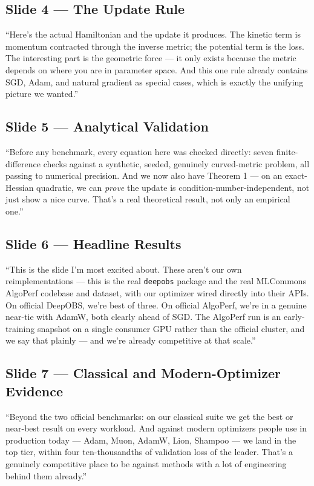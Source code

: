 \documentclass[11pt]{article}
\begin{document}
\subsection*{Slide 4 --- The Update Rule}
``Here's the actual Hamiltonian and the update it produces. The kinetic term is momentum
contracted through the inverse metric; the potential term is the loss. The interesting part is
the geometric force --- it only exists because the metric depends on where you are in parameter
space. And this one rule already contains SGD, Adam, and natural gradient as special cases, which
is exactly the unifying picture we wanted.''

\subsection*{Slide 5 --- Analytical Validation}
``Before any benchmark, every equation here was checked directly: seven finite-difference checks
against a synthetic, seeded, genuinely curved-metric problem, all passing to numerical precision.
And we now also have Theorem 1 --- on an exact-Hessian quadratic, we can \emph{prove} the update
is condition-number-independent, not just show a nice curve. That's a real theoretical result,
not only an empirical one.''

\subsection*{Slide 6 --- Headline Results}
``This is the slide I'm most excited about. These aren't our own reimplementations --- this is
the real \texttt{deepobs} package and the real MLCommons AlgoPerf codebase and dataset, with our
optimizer wired directly into their APIs. On official DeepOBS, we're best of three. On official
AlgoPerf, we're in a genuine near-tie with AdamW, both clearly ahead of SGD. The AlgoPerf run is
an early-training snapshot on a single consumer GPU rather than the official cluster, and we say
that plainly --- and we're already competitive at that scale.''

\subsection*{Slide 7 --- Classical and Modern-Optimizer Evidence}
``Beyond the two official benchmarks: on our classical suite we get the best or near-best result
on every workload. And against modern optimizers people use in production today --- Adam, Muon,
AdamW, Lion, Shampoo --- we land in the top tier, within four ten-thousandths of validation loss
of the leader. That's a genuinely competitive place to be against methods with a lot of
engineering behind them already.''
\end{document}
